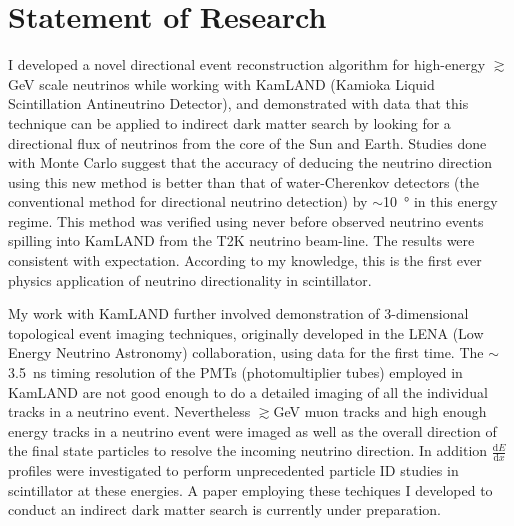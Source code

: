 \documentclass[10pt]{article} %
\begin{document}
\clearpage
\section{Statement of Research}

I developed a novel directional event reconstruction algorithm for high-energy
$\gtrsim$\si{\giga\electronvolt} scale neutrinos while working with KamLAND
(Kamioka Liquid Scintillation Antineutrino Detector), and demonstrated with
data that this technique can be applied to indirect dark matter search by
looking for a directional flux of neutrinos from the core of the Sun and Earth.
Studies done with Monte Carlo suggest that the accuracy of deducing the
neutrino direction using this new method is better than that of water-Cherenkov
detectors (the conventional method for directional neutrino detection) by
$\sim$\SI{10}{\degree} in this energy regime. This method was verified using
never before observed neutrino events spilling into KamLAND from the T2K
neutrino beam-line. The results were consistent with expectation. According to
my knowledge, this is the first ever physics application of neutrino
directionality in scintillator.

My work with KamLAND further involved demonstration of 3-dimensional
topological event imaging techniques, originally developed in the LENA (Low
Energy Neutrino Astronomy) collaboration, using data for the first time. The
$\sim$\SI{3.5}{\nano\second} timing resolution of the PMTs (photomultiplier
tubes) employed in KamLAND are not good enough to do a detailed imaging of all
the individual tracks in a neutrino event. Nevertheless
$\gtrsim$\si{\giga\electronvolt} muon tracks and high enough energy tracks in a
neutrino event were imaged as well as the overall direction of the final state
particles to resolve the incoming neutrino direction. In addition
$\frac{\mathrm{d}E}{\mathrm{d}x}$ profiles were investigated to perform
unprecedented particle ID studies in scintillator at these energies. A paper
employing these techiques I developed to conduct an indirect dark matter search
is currently under preparation.
\end{document}
